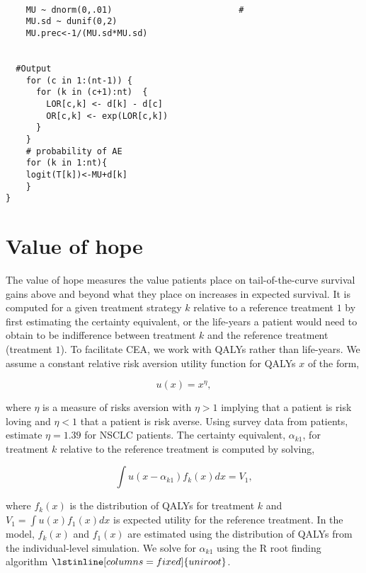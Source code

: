 \documentclass[11pt,final,fleqn]{article}\usepackage[]{graphicx}\usepackage[]{color}
\theoremstyle{plain}
\newcommand\R{{\textsf{R}}}
\begin{document}
\begin{appendices}
\begin{verbatim}
      
    MU ~ dnorm(0,.01)                         #
    MU.sd ~ dunif(0,2) 
    MU.prec<-1/(MU.sd*MU.sd)
    
      
  #Output                                       
    for (c in 1:(nt-1)) {                        
      for (k in (c+1):nt)  { 
        LOR[c,k] <- d[k] - d[c]
        OR[c,k] <- exp(LOR[c,k])
      }  
    }
    # probability of AE
    for (k in 1:nt){ 
    logit(T[k])<-MU+d[k]
    }
}

\end{verbatim}



\section{Value of hope} \label{app:value-of-hope}
The value of hope measures the value patients place on tail-of-the-curve survival gains above and beyond what they place on increases in expected survival. It is computed for a given treatment strategy $k$ relative to a reference treatment $1$ by first estimating the certainty equivalent, or the life-years a patient would need to obtain to be indifference between treatment $k$ and the reference treatment (treatment $1$). To facilitate CEA, we work with QALYs rather than life-years. We assume a constant relative risk aversion utility function for QALYs $x$ of the form,

\begin{equation}\label{eqn:value-of-hope}
u(x) = x^\eta,
\end{equation}

where $\eta$ is a measure of risks aversion with $\eta > 1$ implying that a patient is risk loving and $\eta < 1$ that a patient is risk averse. Using survey data from patients, \citet{shafrin2017patient} estimate $\eta = 1.39$ for NSCLC patients. The certainty equivalent, $\alpha_{k1}$, for treatment $k$ relative to the reference treatment is computed by solving,

\begin{equation}
\int u(x - \alpha_{k1}) f_k(x) dx = V_1,
\end{equation}    

where $f_k(x)$ is the distribution of QALYs for treatment $k$ and $V_1 = \int u(x)f_1(x) dx$ is expected utility for the reference treatment. In the model, $f_k(x)$ and $f_1(x)$ are estimated using the distribution of QALYs from the individual-level simulation. We solve for $\alpha_{k1}$ using the \R{} root finding algorithm $\lstinline[columns=fixed]{uniroot}$. 


\end{appendices}
\end{document}
